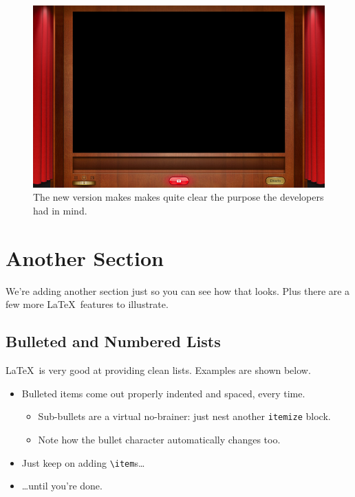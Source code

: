 \documentclass{article}
\begin{document}
\begin{figure}
\centering
\includegraphics[width=5in]{photoboothFullscreenSmall.jpg}
\caption{The new version makes makes quite clear the purpose the developers had in mind.}
\label{New Photo Booth}
\end{figure}


\section{Another Section}

We're adding another section just so you can see how that looks.  Plus there are a few more \LaTeX\ features to illustrate.

\subsection{Bulleted and Numbered Lists}

\LaTeX\ is very good at providing clean lists.  Examples are shown below.

\begin{itemize}
\item Bulleted items come out properly indented and spaced, every time.

\begin{itemize}
\item Sub-bullets are a virtual no-brainer: just nest another \verb!itemize! block.
\item Note how the bullet character automatically changes too.
\end{itemize}

\item Just keep on adding \verb!\item!s\ldots

\item \ldots until you're done.
\end{itemize}
\end{document}
